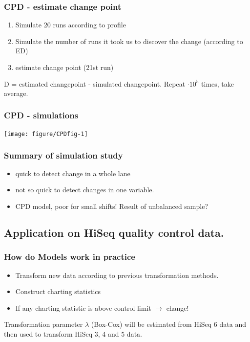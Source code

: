\documentclass[10pt]{beamer}\usepackage[]{graphicx}\usepackage[]{color}
\newenvironment{knitrout}{}{} %
\begin{document}
\begin{frame}\frametitle{CPD - estimate change point}
\begin{enumerate}
\item Simulate 20 runs according to profile
\item Simulate the number of runs it took us to discover the change (according to ED)
\item estimate change point (21st run)
\end{enumerate}
D = estimated changepoint - simulated changepoint. Repeat $\cdot 10^5$ times, take average.
\end{frame}


\begin{frame}\frametitle{CPD - simulations}
\begin{knitrout}
\color{fgcolor}
\texttt{[image: figure/CPDfig-1]} 

\end{knitrout}
\end{frame}

\begin{frame}\frametitle{Summary of simulation study}
\begin{itemize}
\item quick to detect change in a whole lane
\item not so quick to detect changes in one variable. 
\item CPD model, poor for small shifts! Result of unbalanced sample?
\end{itemize}
\end{frame}


\subsection{Application on HiSeq quality control data.}

\begin{frame}\frametitle{How do Models work in practice}
\begin{itemize}
\item Transform new data according to previous transformation methods.
\item Construct charting statistics 
\item If any charting statistic is above control limit $\rightarrow$ change!
\end{itemize}
Transformation parameter $\lambda$ (Box-Cox) will be estimated from HiSeq 6 data and then used to transform HiSeq 3, 4 and 5 data.
\end{frame}
\end{document}
